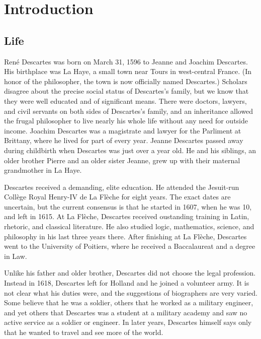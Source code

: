 \chapter{Introduction}

\section*{Life}

René Descartes was born on March 31, 1596 to Jeanne and Joachim Descartes. His birthplace was La Haye, a small town near Tours in west-central France. (In honor of the philosopher, the town is now officially named Descartes.) Scholars disagree about the precise social status of Descartes's family, but we know that they were well educated and of significant means. There were doctors, lawyers, and civil servants on both sides of Descartes's family, and an inheritance allowed the frugal philosopher to live nearly his whole life without any need for outside income. Joachim Descartes was a magistrate and lawyer for the Parliment at Brittany, where he lived for part of every year. Jeanne Descartes passed away during childbirth when Descartes was just over a year old. He and his siblings, an older brother Pierre and an older sister Jeanne, grew up with their maternal grandmother in La Haye.

Descartes received a demanding, elite education. He attended the Jesuit-run Collège Royal Henry-IV de La Flèche for eight years. The exact dates are uncertain, but the current consensus is that he started in 1607, when he was 10, and left in 1615. At La Flèche, Descartes received oustanding training in Latin, rhetoric, and classical literature. He also studied logic, mathematics, science, and philosophy in his last three years there. After finishing at La Flèche, Descartes went to the University of Poitiers, where he received a Baccalaureat and a degree in Law.

Unlike his father and older brother, Descartes did not choose the legal profession. Instead in 1618, Descartes left for Holland and he joined a volunteer army. It is not clear what his duties were, and the suggestions of biographers are very varied. Some believe that he was a soldier, others that he worked as a military engineer, and yet others that Descartes was a student at a military academy and saw no active service as a soldier or engineer. In later years, Descartes himself says only that he wanted to travel and see more of the world.

